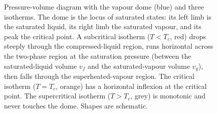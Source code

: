 \begin{figure}[htbp]
\caption[Pressure-volume isotherms and the vapour dome]{Pressure-volume
diagram with the vapour dome (blue) and three isotherms. The dome is the
locus of saturated states: its left limb is the saturated liquid, its
right limb the saturated vapour, and its peak the critical point. A
subcritical isotherm ($T<T_c$, red) drops steeply through the
compressed-liquid region, runs horizontal across the two-phase region at
the saturation pressure (between the saturated-liquid volume $v_f$ and
the saturated-vapour volume $v_g$), then falls through the
superheated-vapour region. The critical isotherm ($T=T_c$, orange) has a
horizontal inflexion at the critical point. The supercritical isotherm
($T>T_c$, grey) is monotonic and never touches the dome. Shapes are
schematic.}
\label{fig:vol04ch02:pv-isotherms-dome}
\end{figure}
